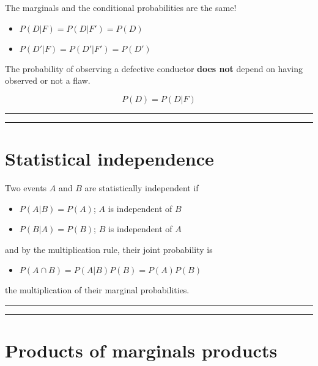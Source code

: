 \documentclass[
]{book}
\providecommand{\tightlist}{%
  \setlength{\itemsep}{0pt}\setlength{\parskip}{0pt}}
\begin{document}
The marginals and the conditional probabilities are the same!

\begin{itemize}
\tightlist
\item
  \(P(D|F)=P(D|F')=P(D)\)
\item
  \(P(D'|F)=P(D'|F')=P(D')\)
\end{itemize}

The probability of observing a defective conductor \textbf{does not} depend on having observed or not a flaw.

\[P(D) = P(D|F)\]

\begin{center}\rule{0.5\linewidth}{0.5pt}\end{center}

\begin{center}\rule{0.5\linewidth}{0.5pt}\end{center}

\hypertarget{statistical-independence-3}{%
\section{Statistical independence}\label{statistical-independence-3}}

Two events \(A\) and \(B\) are statistically independent if

\begin{itemize}
\tightlist
\item
  \(P(A|B)=P(A)\); \(A\) is independent of \(B\)
\item
  \(P(B|A)=P(B)\); \(B\) is independent of \(A\)
\end{itemize}

and by the multiplication rule, their joint probability is

\begin{itemize}
\tightlist
\item
  \(P(A\cap B)=P(A|B)P(B)=P(A)P(B)\)
\end{itemize}

the multiplication of their marginal probabilities.

\begin{center}\rule{0.5\linewidth}{0.5pt}\end{center}

\begin{center}\rule{0.5\linewidth}{0.5pt}\end{center}

\hypertarget{products-of-marginals-products}{%
\section{Products of marginals products}\label{products-of-marginals-products}}
\end{document}
